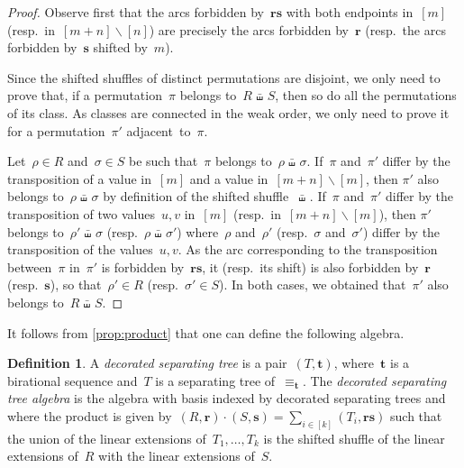 \documentclass{amsart}
\theoremstyle{definition}
\newtheorem{definition}[theorem]{Definition}
\renewcommand{\b}[1]{{\boldsymbol{#1}}} %
\newcommand{\ssm}{\smallsetminus} %
\newcommand{\shiftedShuffle}{\,\bar\shuffle\,} %
\newcommand{\darkblue}{\color{darkblue}} %
\newcommand{\defn}[1]{\textsl{\darkblue #1}} %
\begin{document}
\begin{proof}
Observe first that the arcs forbidden by~$\b{rs}$ with both endpoints in~$[m]$ (resp.~in~$[m+n] \ssm [n]$) are precisely the arcs forbidden by~$\b{r}$ (resp.~the arcs forbidden by~$\b{s}$ shifted by~$m$).

Since the shifted shuffles of distinct permutations are disjoint, we only need to prove that, if a permutation~$\pi$ belongs to~$R \shiftedShuffle S$, then so do all the permutations of its class.
As classes are connected in the weak order, we only need to prove it for a permutation~$\pi'$ adjacent~to~$\pi$.

Let~$\rho \in R$ and~$\sigma \in S$ be such that~$\pi$ belongs to~$\rho \shiftedShuffle \sigma$.
If~$\pi$ and~$\pi'$ differ by the transposition of a value in~$[m]$ and a value in~$[m+n] \ssm [m]$, then $\pi'$ also belongs to~$\rho \shiftedShuffle \sigma$ by definition of the shifted shuffle~$\shiftedShuffle$.
If~$\pi$ and~$\pi'$ differ by the transposition of two values~$u,v$ in~$[m]$ (resp.~in~$[m+n] \ssm [m]$), then $\pi'$ belongs to~$\rho' \shiftedShuffle \sigma$ (resp.~$\rho \shiftedShuffle \sigma'$) where~$\rho$ and~$\rho'$ (resp.~$\sigma$ and~$\sigma'$) differ by the transposition of the values~$u,v$.
As the arc corresponding to the transposition between~$\pi$ in~$\pi'$ is forbidden by~$\b{rs}$, it (resp.~its shift) is also forbidden by~$\b{r}$ (resp.~$\b{s}$), so that~$\rho' \in R$ (resp.~$\sigma' \in S$).
In both cases, we obtained that~$\pi'$ also belongs to~$R \shiftedShuffle S$.
\end{proof}

It follows from \cref{prop:product} that one can define the following algebra.

\begin{definition}
A \defn{decorated separating tree} is a pair~$(T, \b{t})$, where~$\b{t}$ is a birational sequence and~$T$ is a separating tree of~$\equiv_\b{t}$.
The \defn{decorated separating tree algebra} is the algebra with basis indexed by decorated separating trees and where the product is given by~$(R, \b{r}) \cdot (S, \b{s}) = \sum_{i \in [k]} (T_i, \b{rs})$ such that the union of the linear extensions of~$T_1, \dots, T_k$ is the shifted shuffle of the linear extensions of~$R$ with the linear extensions of~$S$.
\end{definition}
\end{document}
